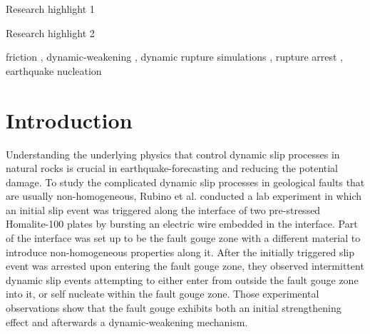 \documentclass[final,a4paper]{elsarticle}
\begin{document}
\begin{frontmatter}
\begin{abstract}
\end{abstract}


\begin{highlights}
\item Research highlight 1
\item Research highlight 2
\end{highlights}

\begin{keyword}
friction \sep 
dynamic-weakening \sep 
dynamic rupture simulations \sep 
rupture arrest \sep 
earthquake nucleation
\end{keyword}

\end{frontmatter}


\section{Introduction}
\label{sec:introduction}
Understanding the underlying physics that control dynamic slip processes in natural rocks is crucial in earthquake-forecasting and reducing the potential damage. 
To study the complicated dynamic slip processes in geological faults that are usually non-homogeneous, 
Rubino et al. \cite{Rubino2022} conducted a lab experiment in which an initial slip event was triggered along the interface of two pre-stressed Homalite-100 plates by bursting an electric wire embedded in the interface. 
Part of the interface was set up to be the fault gouge zone with a different material to introduce non-homogeneous properties along it. 
After the initially triggered slip event was arrested upon entering the fault gouge zone, 
they observed intermittent dynamic slip events attempting to either enter from outside the fault gouge zone into it, 
or self nucleate within the fault gouge zone. 
Those experimental observations show that the fault gouge exhibits both an initial strengthening effect and afterwards a dynamic-weakening mechanism. 
\end{document}

